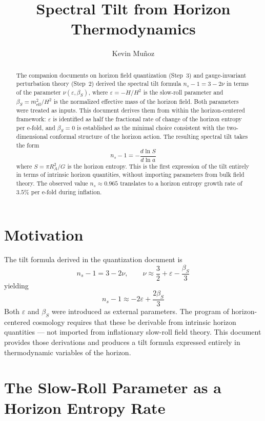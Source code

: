 \documentclass[12pt,a4paper]{article}
\title{Spectral Tilt from Horizon Thermodynamics}
\author{Kevin Mu\~noz}
\date{}
\begin{document}
\maketitle

\begin{abstract}
The companion documents on horizon field quantization (Step~3) and gauge-invariant perturbation theory (Step~2) derived the spectral tilt formula $n_s - 1 = 3 - 2\nu$ in terms of the parameter $\nu(\varepsilon, \beta_S)$, where $\varepsilon = -\dot{H}/H^2$ is the slow-roll parameter and $\beta_S = m_\text{eff}^2/H^2$ is the normalized effective mass of the horizon field. Both parameters were treated as inputs. This document derives them from within the horizon-centered framework: $\varepsilon$ is identified as half the fractional rate of change of the horizon entropy per e-fold, and $\beta_S = 0$ is established as the minimal choice consistent with the two-dimensional conformal structure of the horizon action. The resulting spectral tilt takes the form
\[
n_s - 1 = -\frac{d\ln S}{d\ln a}
\]
where $S = \pi R_A^2 / G$ is the horizon entropy. This is the first expression of the tilt entirely in terms of intrinsic horizon quantities, without importing parameters from bulk field theory. The observed value $n_s \approx 0.965$ translates to a horizon entropy growth rate of $3.5\%$ per e-fold during inflation.
\end{abstract}

\section{Motivation}

The tilt formula derived in the quantization document is
\begin{equation}
n_s - 1 = 3 - 2\nu, \qquad \nu \approx \frac{3}{2} + \varepsilon - \frac{\beta_S}{3} \tag{1}
\end{equation}
yielding
\begin{equation}
n_s - 1 \approx -2\varepsilon + \frac{2\beta_S}{3} \tag{2}
\end{equation}
Both $\varepsilon$ and $\beta_S$ were introduced as external parameters. The program of horizon-centered cosmology requires that these be derivable from intrinsic horizon quantities --- not imported from inflationary slow-roll field theory. This document provides those derivations and produces a tilt formula expressed entirely in thermodynamic variables of the horizon.

\section{The Slow-Roll Parameter as a Horizon Entropy Rate}
\end{document}
